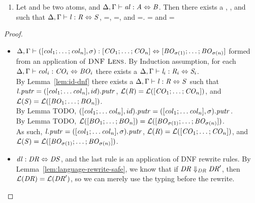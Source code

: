 \begin{lemma}
\begin{enumerate}
\item Let \Atom{} and \AtomAlt{} be two atoms, and $\Delta, \Gamma \vdash \mathit{al} : \mathit{A} \Leftrightarrow \mathit{B}$.  Then there exists a \Lens{}, \Regex{}, and \RegexAlt{} such that $\Delta, \Gamma \vdash \mathit{l} : \mathit{R} \Leftrightarrow \mathit{S}$, \PutRightOf{\Lens}=\PutRightOf{\AtomLens}, \LanguageOf{\Regex}=\LanguageOf{\Atom}, and \LanguageOf{\RegexAlt}=\LanguageOf{\AtomAlt}.  \LanguageOf{\Regex{}} = \LanguageOf{\Atom{}} and
\LanguageOf{\RegexAlt{}} = \LanguageOf{\AtomAlt{}}
\end{enumerate}
\begin{proof}
\begin{itemize}\leavevmode\\
\item $\Delta, \Gamma \vdash ([\mathit{col}_1;\ldots;\mathit{col}_n],\sigma) : [\mathit{CO}_1;\ldots;\mathit{CO}_n] \Leftrightarrow [\mathit{BO}_{\sigma(1)};\ldots;\mathit{BO}_{\sigma(n)}]$ formed from an application of $\textsc{DNF Lens}$.
By Induction assumption, for each $\Delta, \Gamma \vdash \mathit{col}_i : \mathit{CO}_i \Leftrightarrow \mathit{BO}_i$ there exists a $\Delta, \Gamma \vdash \mathit{l}_i : \mathit{R}_i \Leftrightarrow \mathit{S}_i$.\\
By Lemma~\ref{lem:id-dnf} there exists a $\Delta, \Gamma \vdash \mathit{l} : \mathit{R} \Leftrightarrow \mathit{S}$ such that $\mathit{l}.\mathit{putr}=([\mathit{col}_1;\ldots\mathit{col}_n],id).\mathit{putr}$,
$\mathcal{L}(\mathit{R})=\mathcal{L}([\mathit{CO}_1;\ldots;\mathit{CO}_n])$, and
$\mathcal{L}(\mathit{S})=\mathcal{L}([\mathit{BO}_1;\ldots;\mathit{BO}_n])$.\\
By Lemma TODO, $([\mathit{col}_1;\ldots\mathit{col}_n],id).\mathit{putr}=([\mathit{col}_1;\ldots\mathit{col}_n],\sigma).\mathit{putr}$.\\
By Lemma TODO, $\mathcal{L}([\mathit{BO}_1;\ldots;\mathit{BO}_n])=\mathcal{L}([\mathit{BO}_{\sigma(1)};\ldots;\mathit{BO}_{\sigma(n)}])$.\\
As such, $\mathit{l}.\mathit{putr}=([\mathit{col}_1;\ldots\mathit{col}_n],\sigma).\mathit{putr}$,
$\mathcal{L}(\mathit{R})=\mathcal{L}([\mathit{CO}_1;\ldots;\mathit{CO}_n])$,
and $\mathcal{L}(\mathit{S})=\mathcal{L}([\mathit{BO}_{\sigma(1)};\ldots;\mathit{BO}_{\sigma(n)}])$.\\

\item $\mathit{dl} : \mathit{DR} \Leftrightarrow \mathit{DS}$, and the last rule
is an application of DNF rewrite rules.  By Lemma~\ref{lem:language-rewrite-safe},
we know that if $\mathit{DR}\Downarrow_{\mathit{DR}}\mathit{DR}'$, then
$\mathcal{L}(\mathit{DR})=\mathcal{L}(\mathit{DR}')$,
so we can merely use the typing before the rewrite.


\end{itemize}
\end{proof}
\end{lemma}

